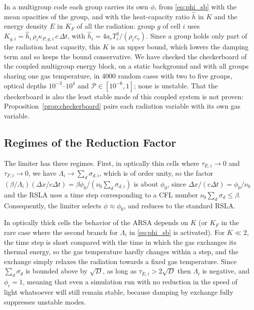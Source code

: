 \documentclass[preprint,12pt,authoryear]{elsarticle}
\newcommand{\calP}{\mathcal{P}}
\begin{document}
In a multigroup code each group carries its own $\phi$, from \autoref{eq:phi_sb} with the mean opacities of the group, and with the heat-capacity ratio $\hat{h}$ in $K$ and the energy density $E$ in $K_F$ of all the radiation: group $g$ of cell $i$ uses $K_{g,i} = \hat{h}_i\,\rho_i\kappa_{P,g,i}\,c\,\Delta t$, with $\hat{h}_i = 4a_rT_i^3/(\rho_i c_v)$. Since a group holds only part of the radiation heat capacity, this $K$ is an upper bound, which lowers the damping term and so keeps the bound conservative. We have checked the checkerboard of the coupled multigroup energy block, on a static background and with all groups sharing one gas temperature, in $4000$ random cases with two to five groups, optical depths $10^{-3}$--$10^4$ and $\calP \in [10^{-6}, 1]$; none is unstable. That the checkerboard is also the least stable mode of this coupled system is not proven: Proposition~\ref{prop:checkerboard} pairs each radiation variable with its own gas variable.

\subsection{Regimes of the Reduction Factor}
\label{ssec:irsla_phi}

The limiter has three regimes. First, in optically thin cells where $\tau_{E,i}\to 0$ and $\tau_{F,i}\to 0$, we have $\Lambda_i \to \sum_d \sigma_{d,i}$, which is of order unity, so the factor $(\beta/\Lambda_i)(\Delta x/c\Delta t) = \beta\phi_0/(\nu_0\sum_d\sigma_{d,i})$ is about $\phi_0$, since $\Delta x/(c\Delta t) = \phi_0/\nu_0$ and the RSLA uses a time step corresponding to a CFL number $\nu_0\sum_d\sigma_d \leq \beta$. Consequently, the limiter selects $\phi \approx \phi_0$, and reduces to the standard RSLA.

In optically thick cells the behavior of the ARSA depends on $K$ (or $K_F$ in the rare case where the second branch for $\Lambda_i$ in \autoref{eq:phi_sb} is activated). For $K \ll 2$, the time step is short compared with the time in which the gas exchanges its thermal energy, so the gas temperature hardly changes within a step, and the exchange simply relaxes the radiation towards a fixed gas temperature. Since $\sum_d \sigma_d$ is bounded above by $\sqrt{D}$, as long as $\tau_{E,i} > 2\sqrt{D}$ then $\Lambda_i$ is negative, and $\phi_i = 1$, meaning that even a simulation run with no reduction in the speed of light whatsoever will still remain stable, because damping by exchange fully suppresses unstable modes.
\end{document}
